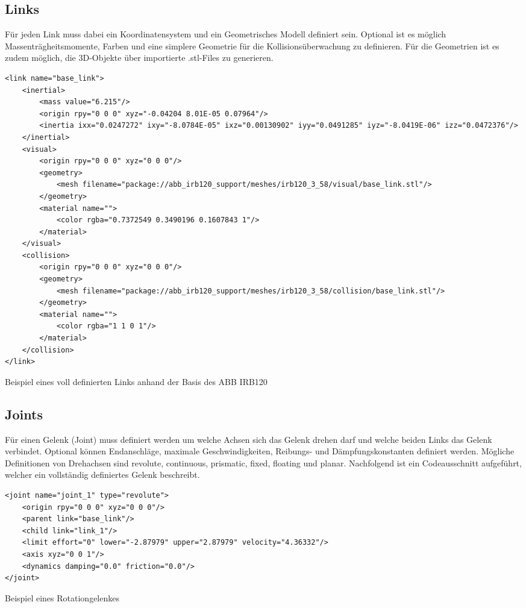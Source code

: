 \subsection{Links}
Für jeden Link muss dabei ein Koordinatensystem und ein Geometrisches Modell definiert sein. Optional ist es möglich Massenträgheitsmomente, Farben und eine simplere Geometrie für die Kollisionsüberwachung zu definieren. Für die Geometrien ist es zudem möglich, die 3D-Objekte über importierte .stl-Files zu generieren.
\begin{code}
	\begin{verbatim}
<link name="base_link">
	<inertial>
		<mass value="6.215"/>
		<origin rpy="0 0 0" xyz="-0.04204 8.01E-05 0.07964"/>
		<inertia ixx="0.0247272" ixy="-8.0784E-05" ixz="0.00130902" iyy="0.0491285" iyz="-8.0419E-06" izz="0.0472376"/>
	</inertial>
	<visual>
		<origin rpy="0 0 0" xyz="0 0 0"/>
		<geometry>
			<mesh filename="package://abb_irb120_support/meshes/irb120_3_58/visual/base_link.stl"/>
		</geometry>
		<material name="">
			<color rgba="0.7372549 0.3490196 0.1607843 1"/>
		</material>
	</visual>
	<collision>
		<origin rpy="0 0 0" xyz="0 0 0"/>
		<geometry>
			<mesh filename="package://abb_irb120_support/meshes/irb120_3_58/collision/base_link.stl"/>
		</geometry>
		<material name="">
			<color rgba="1 1 0 1"/>
		</material>
	</collision>
</link>	
	\end{verbatim}
	\vspace{-15pt}
	\caption{Beispiel eines voll definierten Links anhand der Basis des ABB IRB120}
	\label{code:URDFLink}
\end{code}

\subsection{Joints}
Für einen Gelenk (Joint) muss definiert werden um welche Achsen sich das Gelenk drehen darf und welche beiden Links das Gelenk verbindet. Optional können Endanschläge, maximale Geschwindigkeiten, Reibungs- und Dämpfungskonstanten definiert werden. Mögliche Definitionen von Drehachsen sind revolute, continuous, prismatic, fixed, floating und planar. Nachfolgend ist ein Codeausschnitt aufgeführt, welcher ein vollständig definiertes Gelenk beschreibt.
\begin{code}
	\begin{verbatim}
<joint name="joint_1" type="revolute">
	<origin rpy="0 0 0" xyz="0 0 0"/>
	<parent link="base_link"/>
	<child link="link_1"/>
	<limit effort="0" lower="-2.87979" upper="2.87979" velocity="4.36332"/>
	<axis xyz="0 0 1"/>
	<dynamics damping="0.0" friction="0.0"/>
</joint>
	\end{verbatim}
	\vspace{-15pt}
	\caption{Beispiel eines Rotationgelenkes}
	\label{code:URDFJoint}
\end{code}

